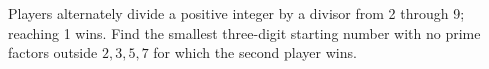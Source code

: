 Players alternately divide a positive integer by a divisor from 2 through 9; reaching 1 wins. Find the smallest three-digit starting number with no prime factors outside $2,3,5,7$ for which the second player wins.
